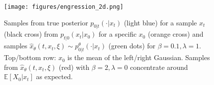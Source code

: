 \begin{figure}
    \centering
        \texttt{[image: figures/engression\_2d.png]}
    \caption{Samples from true posterior $p_{0 \vert t}(\cdot | x_t)$ (light blue) for a sample $x_t$ (black cross) from $p_ {t|0}(x_t|x_0)$ for a specific $x_0$ (orange cross) and samples $\hat{x}_{\theta}(t,x_{t},\xi) \sim p^\theta_{0|t}(\cdot|x_t)$ (green dots) for $\beta=0.1,\lambda=1$.  Top/bottom row: $x_0$ is the mean of the left/right Gaussian. Samples from $\hat{x}_{\theta}(t,x_{t},\xi)$ (red) with $\beta=2,\lambda=0$ concentrate around $\mathbb{E}[X_0 | x_t]$ as expected.}
    \label{fig:trajectories_2d}
\end{figure}